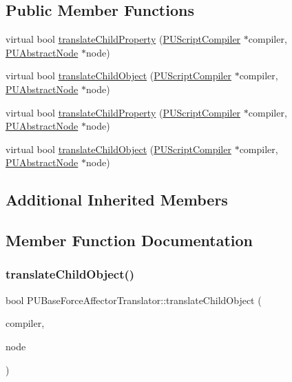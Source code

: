 \subsection*{Public Member Functions}
\begin{DoxyCompactItemize}
\item 
virtual bool \hyperlink{classPUBaseForceAffectorTranslator_a70700116d55fa4854571c99794debd92}{translate\+Child\+Property} (\hyperlink{classPUScriptCompiler}{P\+U\+Script\+Compiler} $\ast$compiler, \hyperlink{classPUAbstractNode}{P\+U\+Abstract\+Node} $\ast$node)
\item 
virtual bool \hyperlink{classPUBaseForceAffectorTranslator_ae06c86d3fad80203052c7deeddd6ac2b}{translate\+Child\+Object} (\hyperlink{classPUScriptCompiler}{P\+U\+Script\+Compiler} $\ast$compiler, \hyperlink{classPUAbstractNode}{P\+U\+Abstract\+Node} $\ast$node)
\item 
virtual bool \hyperlink{classPUBaseForceAffectorTranslator_aaf7589c803d4e1a77903b5da224907c1}{translate\+Child\+Property} (\hyperlink{classPUScriptCompiler}{P\+U\+Script\+Compiler} $\ast$compiler, \hyperlink{classPUAbstractNode}{P\+U\+Abstract\+Node} $\ast$node)
\item 
virtual bool \hyperlink{classPUBaseForceAffectorTranslator_a2703835c30b64091e9dd72077e1999a9}{translate\+Child\+Object} (\hyperlink{classPUScriptCompiler}{P\+U\+Script\+Compiler} $\ast$compiler, \hyperlink{classPUAbstractNode}{P\+U\+Abstract\+Node} $\ast$node)
\end{DoxyCompactItemize}
\subsection*{Additional Inherited Members}


\subsection{Member Function Documentation}
\mbox{\label{classPUBaseForceAffectorTranslator_ae06c86d3fad80203052c7deeddd6ac2b}} 
\subsubsection{\texorpdfstring{translate\+Child\+Object()}{translateChildObject()}\hspace{0.1cm}{\footnotesize\ttfamily [1/2]}}
{\footnotesize\ttfamily bool P\+U\+Base\+Force\+Affector\+Translator\+::translate\+Child\+Object (\begin{DoxyParamCaption}\item[{\hyperlink{classPUScriptCompiler}{P\+U\+Script\+Compiler} $\ast$}]{compiler,  }\item[{\hyperlink{classPUAbstractNode}{P\+U\+Abstract\+Node} $\ast$}]{node }\end{DoxyParamCaption})\hspace{0.3cm}{\ttfamily [virtual]}}

